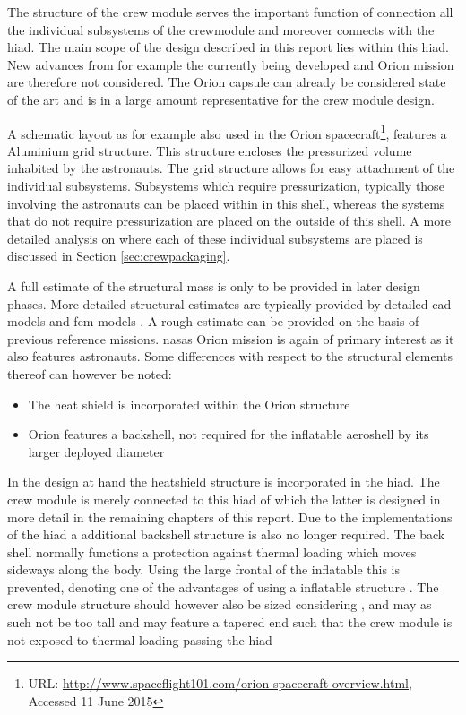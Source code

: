 The structure of the crew module serves the important function of connection all the individual subsystems of the crewmodule and moreover connects with the \gls{hiad}. The main scope of the design described in this report lies within this \gls{hiad}. New advances from for example the currently being developed and Orion mission are therefore not considered. The Orion capsule can already be considered state of the art and is in a large amount representative for the crew module design.

A schematic layout as for example also used in the Orion spacecraft\footnote{URL: \url{http://www.spaceflight101.com/orion-spacecraft-overview.html}, Accessed 11 June 2015 }, features a Aluminium grid structure. This structure encloses the pressurized volume inhabited by the astronauts. The grid structure allows for easy attachment of the individual subsystems. Subsystems which require pressurization, typically those involving the astronauts can be placed within in this shell, whereas the systems that do not require pressurization are placed on the outside of this shell. A more detailed analysis on where each of these individual subsystems are placed is discussed in Section \ref{sec:crewpackaging}.


A full estimate of the structural mass is only to be provided in later design phases. More detailed structural estimates are typically provided by detailed \gls{cad} models and \gls{fem} models \cite{Wertz2011}. A rough estimate can be provided on the basis of previous reference missions. \glspl{nasa} Orion mission is again of primary interest as it also features astronauts. Some differences with respect to the structural elements thereof can however be noted:

\begin{itemize}
\item The heat shield is incorporated within the Orion structure
\item Orion features a backshell, not required for the inflatable aeroshell by its larger deployed diameter
\end{itemize}


In the design at hand the heatshield structure is incorporated in the \gls{hiad}. The crew module is merely connected to this \gls{hiad} of which the latter is designed in more detail in the remaining chapters of this report. Due to the implementations of the \gls{hiad} a additional backshell structure is also no longer required. The back shell normally functions a protection against thermal loading which moves sideways along the body. Using the large frontal of the inflatable this is prevented, denoting one of the advantages of using a inflatable structure \cite{Hughes2005}. The crew module structure should however also be sized considering , and may as such not be too tall and may feature a tapered end such that the crew module is not exposed to thermal loading passing the \gls{hiad}


